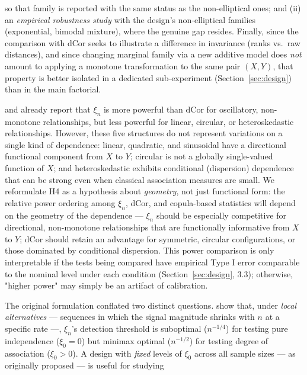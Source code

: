 \documentclass[article]{ajs}
\begin{document}
\begin{description}
  so that family is reported with the same status as the non-elliptical
  ones; and (ii) an \emph{empirical robustness study} with the design's
  non-elliptical families (exponential, bimodal mixture), where the
  genuine gap resides. Finally, since the comparison with dCor seeks to
  illustrate a difference in invariance (ranks vs.\ raw distances), and
  since changing marginal family via a new additive model does
  \emph{not} amount to applying a monotone transformation to the same
  pair $(X,Y)$, that property is better isolated in a dedicated
  sub-experiment (Section~\ref{sec:design}) than in the main factorial.
\item[H4 (dependence geometry).] \cite{chatterjee2021} and
  \cite{gao2024} already report that $\xi_n$ is more powerful than dCor
  for oscillatory, non-monotone relationships, but less powerful for
  linear, circular, or heteroskedastic relationships. However, these
  five structures do not represent variations on a single kind of
  dependence: linear, quadratic, and sinusoidal have a directional
  functional component from $X$ to $Y$; circular is not a globally
  single-valued function of $X$; and heteroskedastic exhibits
  conditional (dispersion) dependence that can be strong even when
  classical association measures are small. We reformulate H4 as a
  hypothesis about \emph{geometry}, not just functional form: the
  relative power ordering among $\xi_n$, dCor, and copula-based
  statistics will depend on the geometry of the dependence --- $\xi_n$
  should be especially competitive for directional, non-monotone
  relationships that are functionally informative from $X$ to $Y$;
  dCor should retain an advantage for symmetric, circular
  configurations, or those dominated by conditional dispersion. This
  power comparison is only interpretable if the tests being compared
  have empirical Type I error comparable to the nominal level under
  each condition (Section~\ref{sec:design}, 3.3); otherwise, "higher
  power" may simply be an artifact of calibration.
\item[H5 (dependence regime).] The original formulation conflated two
  distinct questions. \cite{auddy2024} show that, under \emph{local
  alternatives} --- sequences in which the signal magnitude shrinks
  with $n$ at a specific rate ---, $\xi_n$'s detection threshold is
  suboptimal ($n^{-1/4}$) for testing pure independence ($\xi_0=0$) but
  minimax optimal ($n^{-1/2}$) for testing degree of association
  ($\xi_0>0$). A design with \emph{fixed} levels of $\xi_0$ across all
  sample sizes --- as originally proposed --- is useful for studying

\end{description}
\end{document}
